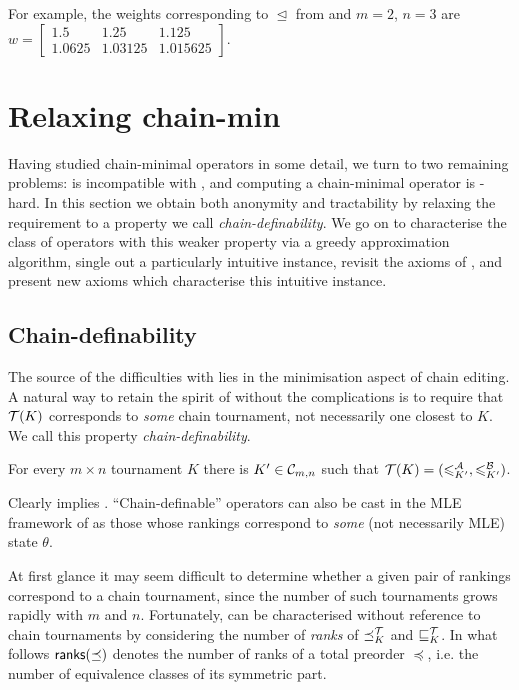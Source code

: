 For example, the weights corresponding to $\trianglelefteq$ from
 and $m = 2$, $n = 3$ are
$
    w = \left[\begin{smallmatrix}
        1.5 & 1.25 & 1.125 \\
        1.0625 & 1.03125 & 1.015625
    \end{smallmatrix}\right]
$.

\section{Relaxing chain-min}
\label{tourn_sec_relaxing_chain_min}

Having studied chain-minimal operators in some detail, we turn to two remaining
problems: \chainmin{} is incompatible with \anon{}, and
computing a chain-minimal operator is -hard. In this
section we obtain both anonymity and tractability by relaxing the
\chainmin{} requirement to a property we call
\emph{chain-definability}. We go on to characterise the class of operators with
this weaker property via a greedy approximation algorithm, single out a
particularly intuitive instance, revisit the axioms of
, and present new axioms which characterise
this intuitive instance.

\subsection{Chain-definability}

The source of the difficulties with \chainmin{} lies in the
minimisation aspect of chain editing. A natural way to retain the spirit of
\chainmin{} without the complications is to require that $\mathcal{T}(K)$
corresponds to \emph{some} chain tournament, not necessarily one closest to
$K$. We call this property \emph{chain-definability}.

\begin{axiom}[\chaindef{}]
    For every $m \times n$ tournament $K$ there is $K' \in \mathcal{C}_{m,n}$ such that
    $\mathcal{T}(K) = ({\leqslant^{\mathcal{A}}_{K'}}, {\leqslant^{\mathcal{B}}_{K'}})$.
\end{axiom}

Clearly \chainmin{} implies \chaindef{}. ``Chain-definable''
operators can also be cast in the MLE framework of  as those
whose rankings correspond to \emph{some} (not necessarily MLE) state $\theta$.

At first glance it may seem difficult to determine whether a given pair of
rankings correspond to a chain tournament, since the number of such tournaments
grows rapidly with $m$ and $n$.
%
Fortunately, \chaindef{} can be characterised without reference to
chain tournaments by considering the number of \emph{ranks} of ${\preceq_K^{\mathcal{T}}}$
and ${\sqsubseteq_K^{\mathcal{T}}}$. In what follows $\mathsf{ranks}({\preceq})$ denotes the number of
ranks of a total preorder $\preceq$, i.e. the number of equivalence classes of
its symmetric part.

